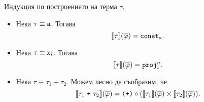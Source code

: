 \begin{hint}
  Индукция по построението на терма $\tau$.
  \begin{itemize}
  \item
    Нека $\tau \equiv \texttt{a}$. Тогава
    \[\llbracket{\tau}\rrbracket(\overline{\varphi}) = \texttt{const}_a.\]
  \item
    Нека $\tau \equiv \texttt{x}_i$. Тогава
    \[\llbracket{\tau}\rrbracket(\overline{\varphi}) = \texttt{proj}^n_i.\]
  \item
    Нека $\tau \equiv \tau_1 + \tau_2$.
    Можем лесно да съобразим, че
    \[\val{\tau_1\ \vv{+}\ \tau_2}(\ov{\varphi}) = \plus \circ (\val{\tau_1}(\ov{\varphi}) \times \val{\tau_2}(\ov{\varphi})).\]

\end{itemize}
\end{hint}
